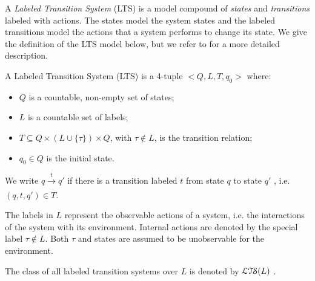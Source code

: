 A \textit{Labeled Transition System} (LTS)
\cite{milner1980calculus} is a model compound of \emph{states}
and \emph{transitions} labeled with actions.  The states model
the system states and the labeled transitions model the actions
that a system performs to change its state.  We give the
definition of the LTS model below, but we refer to
\cite{Tre96,ltsTretmans} for a more detailed description.

\begin{definition}
    A Labeled Transition System (LTS) is a 4-tuple $<Q,L,T,q_0>$
    where:

    \begin{itemize}
    \item $Q$ is a countable, non-empty set of states;

    \item $L$ is a countable set of labels;

    \item $T \subseteq Q \times (L \cup \{\tau\}) \times Q$, with
    $\tau \not\in L$, is the transition relation;

    \item $q_0 \in Q$ is the initial state.

    \end{itemize}

    We write $q \xrightarrow[]{t} q'$ if there is a transition
    labeled $t$ from state $q$ to state $q'$ , i.e. $(q,
    t, q') \in T$.

    The labels in $L$ represent the observable actions of a
    system, i.e. the interactions of the system with its
    environment.  Internal actions are denoted by the special
    label $\tau \not\in L$. Both $\tau$ and states are assumed to
    be unobservable for the environment.

    The class of all labeled transition systems over $L$ is
    denoted by $\EuScript{LTS}(L)$ \cite{Tre96}.

	\label{def:lts}
\end{definition}

